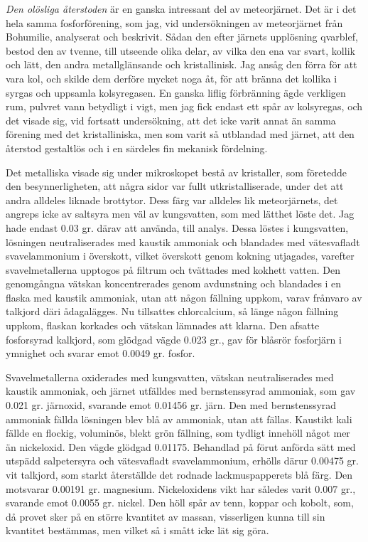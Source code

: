 \documentclass[a4paper, 12pt, oneside, swedish]{article}
\begin{document}
\emph{Den olösliga återstoden} är en ganska intressant del av meteorjärnet. Det är i det hela samma fosforförening, som jag, vid undersökningen av meteorjärnet från Bohumilie, analyserat och beskrivit. Sådan den efter järnets upplösning qvarblef, bestod den av tvenne, till utseende olika delar, av vilka den ena var svart, kollik och lätt, den andra metallglänsande och kristallinisk. Jag ansåg den förra för att vara kol, och skilde dem derföre mycket noga åt, för att bränna det kollika i syrgas och uppsamla kolsyregasen. En ganska liflig förbränning ägde verkligen rum, pulvret vann betydligt i vigt, men jag fick endast ett spår av kolsyregas, och det visade sig, vid fortsatt undersökning, att det icke varit annat än samma förening med det kristalliniska, men som varit så utblandad med järnet, att den återstod gestaltlös och i en särdeles fin mekanisk fördelning.

Det metalliska visade sig under mikroskopet bestå av kristaller, som företedde den besynnerligheten, att några sidor var fullt utkristalliserade, under det att andra alldeles liknade brottytor. Dess färg var alldeles lik meteorjärnets, det angreps icke av saltsyra men väl av kungsvatten, som med lätthet löste det. Jag hade endast 0.03 gr. därav att använda, till analys. Dessa löstes i kungsvatten, lösningen neutraliserades med kaustik ammoniak och blandades med vätesvafladt svavelammonium i överskott, vilket överskott genom kokning utjagades, varefter svavelmetallerna upptogos på filtrum och tvättades med kokhett vatten. Den genomgångna vätskan koncentrerades genom avdunstning och blandades i en flaska med kaustik ammoniak, utan att någon fällning uppkom, varav frånvaro av talkjord däri ådagalägges. Nu tillsattes chlorcalcium, så länge någon fällning uppkom, flaskan korkades och vätskan lämnades att klarna. Den afsatte fosforsyrad kalkjord, som glödgad vägde 0.023 gr., gav för blåsrör fosforjärn i ymnighet och svarar emot 0.0049 gr. fosfor.

Svavelmetallerna oxiderades med kungsvatten, vätskan neutraliserades med kaustik ammoniak, och järnet utfälldes med bernstenssyrad ammoniak, som gav 0.021 gr. järnoxid, svarande emot 0.01456 gr. järn. Den med bernstenssyrad ammoniak fällda lösningen blev blå av ammoniak, utan att fällas. Kaustikt kali fällde en flockig, voluminös, blekt grön fällning, som tydligt innehöll något mer än nickeloxid. Den vägde glödgad 0.01175. Behandlad på förut anförda sätt med utspädd salpetersyra och vätesvafladt svavelammonium, erhölls därur 0.00475 gr. vit talkjord, som starkt återställde det rodnade lackmuspapperets blå färg. Den motsvarar 0.00191 gr. magnesium. Nickeloxidens vikt har således varit 0.007 gr., svarande emot 0.0055 gr. nickel. Den höll spår av tenn, koppar och kobolt, som, då provet sker på en större kvantitet av massan, visserligen kunna till sin kvantitet bestämmas, men vilket så i smått icke lät sig göra.
\end{document}
